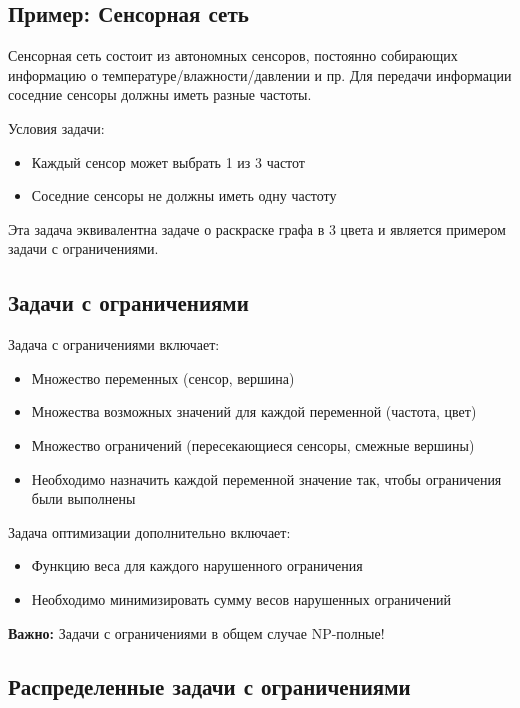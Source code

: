 \subsection{Пример: Сенсорная сеть}

Сенсорная сеть состоит из автономных сенсоров, постоянно собирающих информацию о температуре/влажности/давлении и пр. Для передачи информации соседние сенсоры должны иметь разные частоты.

Условия задачи:

\begin{itemize}
  \item Каждый сенсор может выбрать 1 из 3 частот
  \item Соседние сенсоры не должны иметь одну частоту
\end{itemize}

Эта задача эквивалентна задаче о раскраске графа в 3 цвета и является примером задачи с ограничениями.

\subsection{Задачи с ограничениями}

Задача с ограничениями включает:

\begin{itemize}
  \item Множество переменных (сенсор, вершина)
  \item Множества возможных значений для каждой переменной (частота, цвет)
  \item Множество ограничений (пересекающиеся сенсоры, смежные вершины)
  \item Необходимо назначить каждой переменной значение так, чтобы ограничения были выполнены
\end{itemize}

Задача оптимизации дополнительно включает:

\begin{itemize}
  \item Функцию веса для каждого нарушенного ограничения
  \item Необходимо минимизировать сумму весов нарушенных ограничений
\end{itemize}

\textbf{Важно:} Задачи с ограничениями в общем случае NP-полные!

\subsection{Распределенные задачи с ограничениями}

